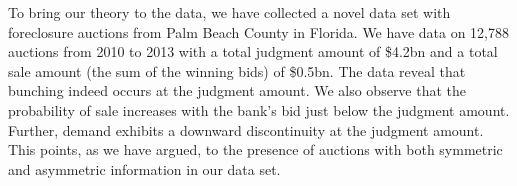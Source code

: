 \documentclass[11pt,twopage]{article}
\begin{document}


To bring our theory to the data, we have collected a novel data set
with foreclosure auctions from Palm Beach County in Florida. We have
data on 12,788 auctions from 2010 to 2013 with a total judgment amount
of \$4.2bn and a total sale amount (the sum of the winning bids) of
\$0.5bn. The data reveal that bunching indeed occurs at the judgment
amount. We also observe that the probability of sale increases with
the bank's bid just below the judgment amount. Further, demand
exhibits a downward discontinuity at the judgment amount. This points,
as we have argued, to the presence of auctions with both symmetric and
asymmetric information in our data set.

\end{document}
